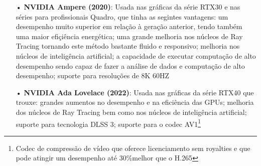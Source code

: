 \documentclass[a4paper,11pt,]{report}
\begin{document}
\begin{itemize}
\pagebreak
 \item[•] \textbf{NVIDIA Ampere (2020)}: Usada nas gráficas da série RTX30 e nas séries para profissionais Quadro, que tinha as segintes vantagens: um desempenho muito superior em relação à geração anterior, tendo também uma maior efiçiência energética; uma grande melhoria nos núcleos de Ray Tracing tornando este método bastante fluido e responsivo; melhoria nos núcleos de inteligência artificial; a capacidade de executar computação de alto desempenho sendo capaz de fazer a análise de dados e computação de alto desempenho; suporte para resoluções de 8K 60HZ
 \item[•] \textbf{NVIDIA Ada Lovelace (2022)}: Usada nas gráficas da série RTX40 que trouxe: grandes aumentos no desempenho e na eficiência das GPUs; melhoria dos núcleos de Ray Tracing bem como nos núcleos de inteligência artificial; suporte para tecnologia DLSS 3; suporte para o codec AV1\footnote{Codec de compressão de vídeo que oferece licenciamento sem royalties e que pode atingir um desempenho até 30\%melhor que o H.265}
\end{itemize}
\end{document}

